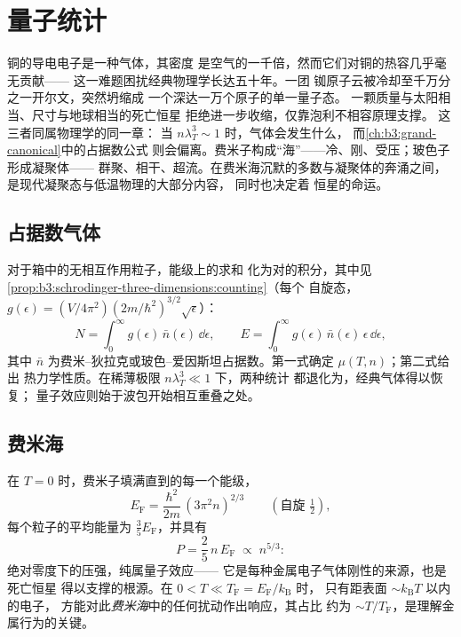\chapter{量子统计}\label{ch:b3:quantum-statistics}

铜的导电电子是一种气体，其密度
是空气的一千倍，然而它们对铜的热容几乎毫无贡献——
这一难题困扰经典物理学长达五十年。一团
铷原子云被冷却至千万分之一开尔文，突然坍缩成
一个深达一万个原子的单一量子态。
一颗质量与太阳相当、尺寸与地球相当的死亡恒星
拒绝进一步收缩，仅靠泡利不相容原理支撑。
这三者同属物理学的同一章：
当 $n\lambda_T^3 \sim 1$ 时，气体会发生什么，
而\cref{ch:b3:grand-canonical}中的占据数公式
则会偏离。费米子构成“海”——冷、刚、受压；玻色子形成凝聚体——
群聚、相干、超流。在费米海沉默的多数与凝聚体的奔涌之间，
是现代凝聚态与低温物理的大部分内容，
同时也决定着
恒星的命运。

\section{占据数气体}

\begin{proposition}[量子气体的基本方法]\label{prop:b3:quantum-statistics:machinery}
对于箱中的无相互作用粒子，能级上的求和
化为对的积分，其中见
\cref{prop:b3:schrodinger-three-dimensions:counting}（每个
自旋态，$g(\epsilon) = (V/4\pi^2)(2m/\hbar^2)^{3/2}\sqrt\epsilon$）：
\[
N = \int_0^\infty g(\epsilon)\,\bar n(\epsilon)\,\dd\epsilon ,
\qquad
E = \int_0^\infty g(\epsilon)\,\bar n(\epsilon)\,\epsilon\,
\dd\epsilon ,
\]
其中 $\bar n$ 为费米–狄拉克或玻色–爱因斯坦占据数。第一式确定
$\mu(T, n)$；第二式给出
热力学性质。在稀薄极限 $n\lambda_T^3 \ll 1$ 下，两种统计
都退化为，经典气体得以恢复；
量子效应则始于波包开始相互重叠之处。
\end{proposition}
\admitted

\section{费米海}

\begin{theorem}[简并费米气体]\label{thm:b3:quantum-statistics:fermi}
在 $T = 0$ 时，费米子填满直到\emph{}的每一个能级，
\[
E_{\text{F}} = \frac{\hbar^2}{2m}\,(3\pi^2n)^{2/3}
\qquad (\text{自旋 } \tfrac12) ,
\]
每个粒子的平均能量为 $\tfrac35 E_{\text{F}}$，并具有
\emph{}
\[
P = \frac25\,n\,E_{\text{F}} \;\propto\; n^{5/3} :
\]
绝对零度下的压强，纯属量子效应——
它是每种金属电子气体刚性的来源，也是死亡恒星
得以支撑的根源。在 $0 < T \ll T_{\text{F}} = E_{\text{F}}/k_{\text{B}}$ 时，
只有距表面 $\sim k_{\text{B}}T$ 以内的电子，
方能对此\emph{费米海}中的任何扰动作出响应，其占比
约为 $\sim T/T_{\text{F}}$，是理解金属行为的关键。
\end{theorem}

